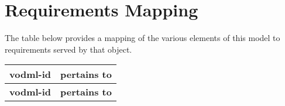 \pagebreak
\section{Requirements Mapping}
\label{sect:req_map}

The table below provides a mapping of the various elements of this model to requirements served by that object.

\small
\begin{longtable}[l]{|l|l|}
  \hline
  \textbf{vodml-id} & \textbf{pertains to}    \\
  \hline
  \endfirsthead
  \hline
  \textbf{vodml-id} & \textbf{pertains to}    \\
  \hline
  \endhead


\end{longtable}
